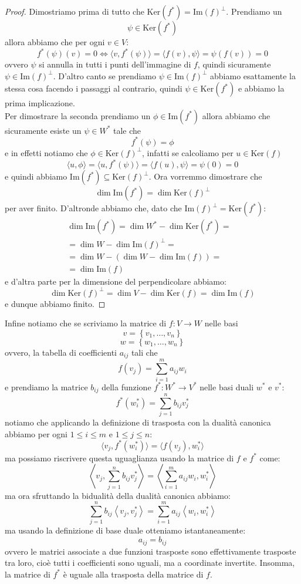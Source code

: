 \documentclass[11pt]{scrartcl}
\newcommand{\Immagine}[1]{\text{Im}\left(#1\right)}
\renewcommand{\ker}[1]{\text{Ker}\left(#1\right)}
\begin{document}
   	 \begin{proof}
   	 	Dimostriamo prima di tutto che $\ker{f^*}=\Immagine{f}^\perp$. Prendiamo un $$\psi\in \ker{f^*}$$
   	 	allora abbiamo che per ogni $v\in V$:
   	 	$$f^*(\psi)(v)=0 \iff \langle v,f^*(\psi)\rangle=\langle f(v),\psi\rangle =\psi(f(v))=0$$
   	 	ovvero $\psi$ si annulla in tutti i punti dell'immagine di $f$, quindi sicuramente $\psi\in \Immagine{f}^\perp$. D'altro canto se prendiamo $\psi \in \Immagine{f}^\perp$ abbiamo esattamente la stessa cosa facendo i passaggi al contrario, quindi $\psi\in \ker{f^*}$ e abbiamo la prima implicazione. \\
   	 	Per dimostrare la seconda prendiamo un $\phi \in \Immagine{f^*}$ allora abbiamo che sicuramente esiste un $\psi\in W^*$ tale che 
   	 	$$f^*(\psi)=\phi$$ 
   	 	e in effetti notiamo che $\phi\in \ker{f}^\perp$, infatti se calcoliamo per $u\in \ker{f}$
   	 	$$\langle u, \phi \rangle=\langle u,f^*(\psi)\rangle = \langle f(u), \psi\rangle =\psi(0)=0$$
   	 	e quindi abbiamo $\Immagine{f^*}\subseteq \ker{f}^\perp$. Ora vorremmo dimostrare che 
   	 	$$\dim\Immagine{f^*}=\dim\ker{f}^\perp$$
   	 	per aver finito. D'altronde abbiamo che, dato che $\Immagine{f}^\perp=\ker{f^*}$:
   	 	\begin{align*}
   	 		\dim\Immagine{f^*}=\dim W^*-\dim\ker{f^*}=  & \\
   	 		= \dim W - \dim\Immagine{f}^\perp = & \\
   	 		=\dim W - \left(\dim W - \dim \Immagine{f}\right)= & \\
   	 		= \dim\Immagine{f} &
   	 	\end{align*}
   	 	e d'altra parte per la dimensione del perpendicolare abbiamo:
   	 	$$\dim\ker{f}^\perp=\dim V - \dim\ker{f}=\dim\Immagine{f}$$
   	 	e dunque abbiamo finito.
   	 \end{proof}
   	 Infine notiamo che se scriviamo la matrice di $f:V\to W$ nelle basi 
   	 $$v=\left\{v_1,\dots,v_n\right\}$$
   	 $$w=\left\{w_1,\dots,w_n\right\}$$
   	 ovvero, la tabella di coefficienti $a_{ij}$ tali che
   	 $$f\left(v_j\right)=\sum_{i=1}^m a_{ij}w_i$$
   	 e prendiamo la matrice $b_{ij}$ della funzione $f^*:W^*\to V^*$ nelle basi duali $w^*$ e $v^*$:
   	 $$f^*\left(w^*_i\right)=\sum_{j=1}^n b_{ij}v^*_j$$
   	 notiamo che applicando la definizione di trasposta con la dualità canonica abbiamo per ogni $1\le i\le m$ e $1\le j\le n$: 
   	 $$\langle v_j,f^*\left(w_i^*\right) \rangle=\langle f(v_j),w_i^*\rangle$$
   	 ma possiamo riscrivere questa uguaglianza usando la matrice di $f$ e $f^*$ come:
   	 $$\left\langle v_j,\sum_{j=1}^n b_{ij}v^*_j \right\rangle=\left\langle \sum_{i=1}^m a_{ij}w_i,w_i^*\right\rangle$$
   	 ma ora sfruttando la bidualità della dualità canonica abbiamo:
   	 $$\sum_{j=1}^n b_{ij}\left\langle v_j,v_j^*\right\rangle=\sum_{i=1}^m a_{ij}\left\langle w_i,w_i^* \right\rangle$$
   	 ma usando la definizione di base duale otteniamo istantaneamente:
   	 $$a_{ij}=b_{ij}$$
   	 ovvero le matrici associate a due funzioni trasposte sono effettivamente trasposte tra loro, cioè tutti i coefficienti sono uguali, ma a coordinate invertite. Insomma, la matrice di $f^*$ è uguale alla trasposta della matrice di $f$.
   	 
\end{document}
